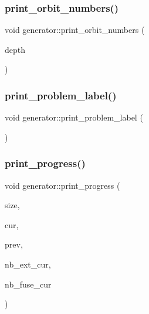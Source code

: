 \subsubsection{\texorpdfstring{print\+\_\+orbit\+\_\+numbers()}{print\_orbit\_numbers()}}
{\footnotesize\ttfamily void generator\+::print\+\_\+orbit\+\_\+numbers (\begin{DoxyParamCaption}\item[{\mbox{\hyperlink{galois_8h_a09fddde158a3a20bd2dcadb609de11dc}{I\+NT}}}]{depth }\end{DoxyParamCaption})}

\mbox{\label{classgenerator_a06d3c064ba84ebe8db3537e6273f16c3}} 
\subsubsection{\texorpdfstring{print\+\_\+problem\+\_\+label()}{print\_problem\_label()}}
{\footnotesize\ttfamily void generator\+::print\+\_\+problem\+\_\+label (\begin{DoxyParamCaption}{ }\end{DoxyParamCaption})}

\mbox{\label{classgenerator_ab1bc556218cd131c802ed1e137ccc4ae}} 
\subsubsection{\texorpdfstring{print\+\_\+progress()}{print\_progress()}\hspace{0.1cm}{\footnotesize\ttfamily [1/2]}}
{\footnotesize\ttfamily void generator\+::print\+\_\+progress (\begin{DoxyParamCaption}\item[{\mbox{\hyperlink{galois_8h_a09fddde158a3a20bd2dcadb609de11dc}{I\+NT}}}]{size,  }\item[{\mbox{\hyperlink{galois_8h_a09fddde158a3a20bd2dcadb609de11dc}{I\+NT}}}]{cur,  }\item[{\mbox{\hyperlink{galois_8h_a09fddde158a3a20bd2dcadb609de11dc}{I\+NT}}}]{prev,  }\item[{\mbox{\hyperlink{galois_8h_a09fddde158a3a20bd2dcadb609de11dc}{I\+NT}}}]{nb\+\_\+ext\+\_\+cur,  }\item[{\mbox{\hyperlink{galois_8h_a09fddde158a3a20bd2dcadb609de11dc}{I\+NT}}}]{nb\+\_\+fuse\+\_\+cur }\end{DoxyParamCaption})}

